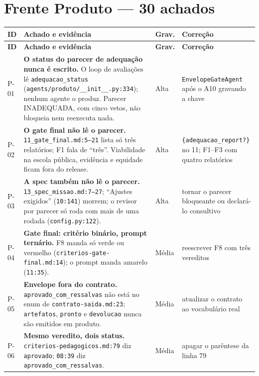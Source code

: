 \documentclass[11pt,a4paper]{article}
\begin{document}
\section{Frente Produto --- 30 achados}

\small
\begin{longtable}{@{}p{0.9cm} >{\raggedright\arraybackslash}p{8.6cm} p{1.1cm} >{\raggedright\arraybackslash}p{4.9cm}@{}}
\toprule
\textbf{ID} & \textbf{Achado e evidência} & \textbf{Grav.} & \textbf{Correção} \\
\midrule
\endfirsthead
\toprule
\textbf{ID} & \textbf{Achado e evidência} & \textbf{Grav.} & \textbf{Correção} \\
\midrule
\endhead
\bottomrule
\endfoot
P-01 & \textbf{O status do parecer de adequação nunca é escrito.} O loop de avaliações lê \texttt{adequacao\_status} (\texttt{agents/produto/\_\_init\_\_.py:334}); nenhum agente o produz. Parecer INADEQUADA, com cinco vetos, não bloqueia nem reexecuta nada. & Alta & \texttt{EnvelopeGateAgent} após o A10 gravando a chave \\
P-02 & \textbf{O gate final não lê o parecer.} \texttt{11\_gate\_final.md:5--21} lista só três relatórios; F1 fala de ``três''. Viabilidade na escola pública, evidência e equidade ficam fora do release. & Alta & \texttt{\{adequacao\_report?\}} no 11; F1--F3 com quatro relatórios \\
P-03 & \textbf{A spec também não lê o parecer.} \texttt{13\_spec\_missao.md:7--27}; ``Ajustes exigidos'' (\texttt{10:141}) morrem; o revisor por parecer só roda com mais de uma rodada (\texttt{config.py:122}). & Alta & tornar o parecer bloqueante ou declará-lo consultivo \\
P-04 & \textbf{Gate final: critério binário, prompt ternário.} F8 manda só verde ou vermelho (\texttt{criterios-gate-final.md:14}); o prompt manda amarelo (\texttt{11:35}). & Média & reescrever F8 com três vereditos \\
P-05 & \textbf{Envelope fora do contrato.} \texttt{aprovado\_com\_ressalvas} não está no enum de \texttt{contrato-saida.md:23}; \texttt{artefatos}, \texttt{pronto} e \texttt{devolucao} nunca são emitidos em produto. & Média & atualizar o contrato ao vocabulário real \\
P-06 & \textbf{Mesmo veredito, dois status.} \texttt{criterios-pedagogicos.md:79} diz \texttt{aprovado}; \texttt{08:39} diz \texttt{aprovado\_com\_ressalvas}. & Média & apagar o parêntese da linha 79 \\

\end{longtable}
\end{document}
